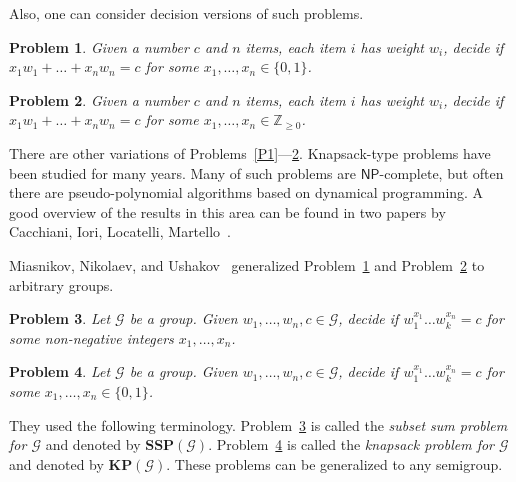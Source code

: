 \documentclass[reqno,12pt]{amsart}
\newtheorem{problem}{Problem}
\theoremstyle{definition}
\newcommand{\NP}{\mathsf{NP}}
\begin{document}
Also, one can consider decision versions of such problems. 

\begin{problem}\label{ClassicalSSP}
    Given a number $c$ and $n$ items, each item $i$ has weight $w_i$, decide if $x_1 w_1 + \ldots + x_n w_n = c$ for some $x_1, \ldots, x_n \in \{0, 1\}$.
\end{problem}

\begin{problem}\label{ClassicalKnapsack}
    Given a number $c$ and $n$ items, each item $i$ has weight $w_i$, decide if $x_1 w_1 + \ldots + x_n w_n = c$ for some $x_1, \ldots, x_n \in \mathbb{Z}_{\geq 0}$.
\end{problem}

There are other variations of Problems~\ref{P1}---\ref{ClassicalKnapsack}. Knapsack-type problems have been studied for many years. 
Many of such problems are $\NP$-complete, but often there are pseudo-polynomial algorithms based on dynamical programming. 
A good overview of the results in this area can be found in two papers by Cacchiani, Iori, Locatelli, Martello~\cite{CacchianiIoriLocatelliMartello2022_1, CacchianiIoriLocatelliMartello2022_2}.

Miasnikov, Nikolaev, and Ushakov~\cite{MiasnikovNikolaevUshakov2015} generalized Problem~\ref{ClassicalSSP} and Problem~\ref{ClassicalKnapsack} to arbitrary groups.

\begin{problem}\label{Problem6}
    Let $\mathcal{G}$ be a group. Given $w_1, \ldots, w_n, c\in \mathcal{G}$, decide if $w_1^{x_1} \ldots w_k^{x_n} = c$ for some non-negative integers $x_1, \ldots, x_n$.
\end{problem}

\begin{problem} \label{Problem7}
    Let $\mathcal{G}$ be a group. Given $w_1, \ldots, w_n, c\in \mathcal{G}$, decide if $w_1^{x_1} \ldots w_k^{x_n} = c$ for some $x_1, \ldots, x_n \in \{0, 1\}$.
\end{problem}

They used the following terminology.
Problem~\ref{Problem6} is called the \textit{subset sum problem for $\mathcal{G}$} and denoted by $\mathbf{SSP}(\mathcal{G})$.
Problem~\ref{Problem7} is called the \textit{knapsack problem for $\mathcal{G}$} and denoted by $\mathbf{KP}(\mathcal{G})$.
These problems can be generalized to any semigroup.
\end{document}

